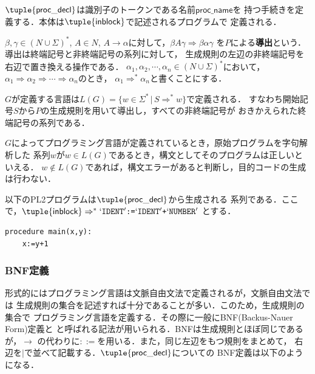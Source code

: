\documentclass[dvipdfmx,a4j]{jbook}
\begin{document}
$\tuple{\mathsf{proc\_decl}}$は識別子のトークンである名前$\mathsf{proc\_name}$を
持つ手続きを定義する．本体は$\tuple{\mathsf{inblock}}$で記述されるプログラムで
定義される．

$\beta,\gamma\in(N\cup\Sigma)^\ast$,
$A\in N$, $A\rightarrow\alpha$に対して，$\beta A\gamma\Rightarrow \beta\alpha\gamma$
を$P$による{\bf 導出}という．導出は終端記号と非終端記号の系列に対して，
生成規則の左辺の非終端記号を右辺で置き換える操作である．
$\alpha_1,\alpha_2,\cdots,\alpha_n\in (N\cup\Sigma)^\ast$において，
$\alpha_1\Rightarrow\alpha_2\Rightarrow\cdots\Rightarrow\alpha_n$のとき，
$\alpha_1\Rightarrow^\ast\alpha_n$と書くことにする．

$G$が定義する言語は$L(G)=\{w\in\Sigma^\ast\,|\,S\Rightarrow^\ast w\}$で定義される．
すなわち開始記号$S$から$P$の生成規則を用いて導出し，すべての非終端記号が
おきかえられた終端記号の系列である．

$G$によってプログラミング言語が定義されているとき，原始プログラムを字句解析した
系列$w$が$w\in L(G)$であるとき，構文としてそのプログラムは正しいといえる．
$w\notin L(G)$であれば，構文エラーがあると判断し，目的コードの生成は行わない．

\begin{Exmp}\label{DerivEx1}
以下のPL2プログラムは$\tuple{\mathsf{proc\_decl}}$から生成される
系列である．ここで，$\tuple{\mathsf{inblock}}\Rightarrow^\ast
`\texttt{IDENT}' \texttt{:=} `\texttt{IDENT}' \texttt{+} `\texttt{NUMBER}'$
とする．
\begin{Verbatim}[frame=single]
  procedure main(x,y):
    x:=y+1
\end{Verbatim}
\end{Exmp}

\subsubsection{BNF定義}

形式的にはプログラミング言語は文脈自由文法で定義されるが，文脈自由文法では
生成規則の集合を記述すれば十分であることが多い．このため，生成規則の集合で
プログラミング言語を定義する．その際に一般にBNF(Backus-Nauer Form)定義と
と呼ばれる記法が用いられる．BNFは生成規則とほぼ同じであるが，$\rightarrow$
の代わりに$\mathtt{::=}$を用いる．また，同じ左辺をもつ規則をまとめて，
右辺を$\texttt{|}$で並べて記載する．$\tuple{\mathsf{proc\_decl}}$についての
BNF定義は以下のようになる．
\end{document}
